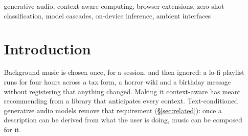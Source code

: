 \documentclass[conference]{IEEEtran}
\begin{document}
\maketitle

\begin{abstract}
A browser extension that plays music conditioned on the page being read must
describe the page, keep page text on the device, and hide a slow generator. We present Web2Music, a Manifest V3 Chrome extension that addresses all
three. The page descriptor takes 86\,ms per page without the embedding model. A
three-stage classifier (keywords, an on-device language-inference model, a hosted
large language model) matches the macro-F1 of a keyword-then-LLM baseline on the
255-page development set (0.689) while sending 38\% fewer pages off the device;
the gates are tuned on those pages, with no held-out set. A mood-level
clip becomes audible 36\,ms after the mood is decided. Page-specific music
replaces it when generation finishes, a median of 13\,s for a 15\,s clip on a
consumer GPU, 62\,s on its CPU and 20\,s on an Apple M4, so in a cold-cache
simulation it is heard on 52\%, 34\% and 48\% of visits. Choosing each loop's cut
by its measured seam lowers the share of seams with an energy jump above 1\,dB from
73\% to 9\% on 176 fresh clips. Generated audio is slightly closer to its intended
mood than mismatched audio on three objective scorers; no listening study was run.
\end{abstract}

\begin{IEEEkeywords}
generative audio, context-aware computing, browser extensions, zero-shot
classification, model cascades, on-device inference, ambient interfaces
\end{IEEEkeywords}

\section{Introduction}
\label{sec:intro}

Background music is chosen once, for a session, and then ignored: a lo-fi
playlist runs for four hours across a tax form, a horror wiki and a birthday
message without registering that anything changed. Making it context-aware
has meant recommending \cite{deldjoo} from a library that anticipates every
context. Text-conditioned generative audio models remove that requirement
(\S\ref{sec:related}): once a description can be derived from what the user
is doing, music can be composed for it.
\end{document}
